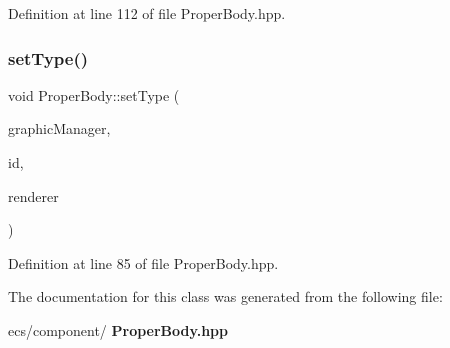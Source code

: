 Definition at line 112 of file Proper\+Body.\+hpp.

\mbox{\label{class_proper_body_a1360cdc97bbf40853bb6faeda572c19d}} 
\subsubsection{set\+Type()}
{\footnotesize\ttfamily void Proper\+Body\+::set\+Type (\begin{DoxyParamCaption}\item[{const std\+::shared\+\_\+ptr$<$ \textbf{ Graphic\+Manager} $>$ \&}]{graphic\+Manager,  }\item[{\textbf{ type\+\_\+id}}]{id,  }\item[{S\+D\+L\+\_\+\+Renderer $\ast$}]{renderer }\end{DoxyParamCaption})\hspace{0.3cm}{\ttfamily [inline]}}



Definition at line 85 of file Proper\+Body.\+hpp.



The documentation for this class was generated from the following file\+:\begin{DoxyCompactItemize}
\item 
ecs/component/\textbf{ Proper\+Body.\+hpp}\end{DoxyCompactItemize}
